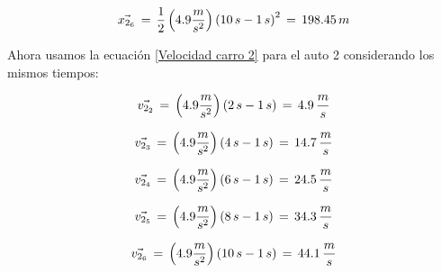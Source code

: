 \documentclass[letterpaper, 12pt]{article}
\begin{document}
\begin{enumerate}
\begin{enumerate}
            \begin{equation}
                \label{2p6}
                \vec{x_{2_{6}}} \thinspace = \thinspace \frac{1}{2} \left( 4.9 \frac{m}{s^{2}} \right) \left( 10\thinspace s -1 \thinspace s \right)^{2} \thinspace = \thinspace 198.45 \thinspace m
            \end{equation}
            
             Ahora usamos la ecuación \ref{Velocidad carro 2} para el auto 2 considerando los mismos tiempos:
             
            \begin{equation}
                \label{2v2}
                \vec{v_{2_{2}}} \thinspace = \thinspace \left( 4.9 \frac{m}{s^{2}} \right) \left( 2 \thinspace s - 1 \thinspace s \right) \thinspace = \thinspace 4.9 \thinspace \frac{m}{s}
            \end{equation}
            
            \begin{equation}
                \label{2v3}
                \vec{v_{2_{3}}} \thinspace = \thinspace \left( 4.9 \frac{m}{s^{2}} \right) \left( 4 \thinspace s - 1 \thinspace s \right) \thinspace = \thinspace 14.7 \thinspace \frac{m}{s}
            \end{equation}
            
            \begin{equation}
                \label{2v4}
                \vec{v_{2_{4}}} \thinspace = \thinspace \left( 4.9 \frac{m}{s^{2}} \right) \left( 6 \thinspace s - 1 \thinspace s \right) \thinspace = \thinspace 24.5 \thinspace \frac{m}{s}
            \end{equation}
            
            \begin{equation}
                \label{2v5}
                \vec{v_{2_{5}}} \thinspace = \thinspace \left( 4.9 \frac{m}{s^{2}} \right) \left( 8 \thinspace s - 1 \thinspace s \right) \thinspace = \thinspace 34.3 \thinspace \frac{m}{s}
            \end{equation}
            
            \begin{equation}
                \label{2v6}
                \vec{v_{2_{6}}} \thinspace = \thinspace \left( 4.9 \frac{m}{s^{2}} \right) \left( 10 \thinspace s - 1 \thinspace s \right) \thinspace = \thinspace 44.1 \thinspace \frac{m}{s}
            \end{equation}
            

\end{enumerate}
\end{enumerate}
\end{document}

